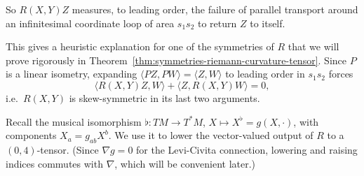 So $R(X,Y)Z$ measures, to leading order, the failure of parallel transport around an infinitesimal coordinate loop of area $s_1 s_2$ to return $Z$ to itself.\\
 
\begin{colremark}
This gives a heuristic explanation for one of the symmetries of $R$ that we will prove rigorously in Theorem~\ref{thm:symmetries-riemann-curvature-tensor}. Since $P$ is a linear isometry, expanding $\langle PZ, PW\rangle = \langle Z, W\rangle$ to leading order in $s_1 s_2$ forces
\[
\langle R(X,Y)Z, W\rangle + \langle Z, R(X,Y)W\rangle = 0,
\]
i.e.\ $R(X,Y)$ is skew-symmetric in its last two arguments.
\end{colremark}


Recall the musical isomorphism $\flat \colon TM \to T^*M$, $X \mapsto X^\flat = g(X, \cdot)$, with components $X_a = g_{ab} X^b$. We use it to lower the vector-valued output of $R$ to a $(0,4)$-tensor. (Since $\nabla g = 0$ for the Levi-Civita connection, lowering and raising indices commutes with $\nabla$, which will be convenient later.)








